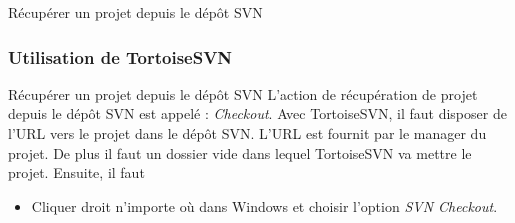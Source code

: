 \documentclass{beamer}
\begin{document}
\begin{frame}
\begin{center}
\huge{Récupérer un projet depuis le dépôt SVN}
\end{center}
\end{frame}

\begin{frame}
\frametitle[\label{chekout}]{Utilisation de TortoiseSVN}
\begin{block}{Récupérer un projet depuis le dépôt SVN }
L'action de récupération de projet depuis le dépôt SVN est appelé :  \alert{\textit{Checkout}}. Avec TortoiseSVN, il faut disposer de l'URL vers le projet dans le dépôt SVN. L'URL est fournit par le manager du projet. De plus il faut un dossier vide dans lequel TortoiseSVN va mettre le projet.  Ensuite, il faut
\begin{itemize}
\item Cliquer droit n'importe où dans Windows et choisir l'option \alert{\textit{SVN Checkout}}.
\end{itemize}
\end{block}
\end{frame}
\end{document}

